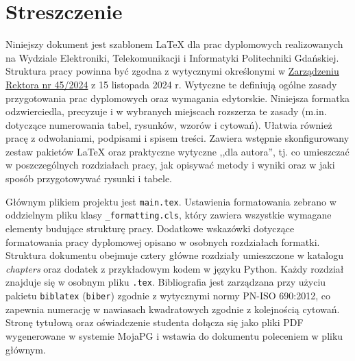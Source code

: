 \chapter*{Streszczenie}

Niniejszy dokument jest szablonem \LaTeX{} dla prac dyplomowych realizowanych na Wydziale Elektroniki, Telekomunikacji i Informatyki Politechniki Gdańskiej. Struktura pracy powinna być zgodna z wytycznymi określonymi w \href{\detokenize{https://cdn.files.pg.edu.pl/eti/Dziekanat/regulaminy/ZR%2045-2024.pdf}}{Zarządzeniu Rektora nr 45/2024} z 15 listopada 2024 r. Wytyczne te definiują ogólne zasady przygotowania prac dyplomowych oraz wymagania edytorskie. Niniejsza formatka odzwierciedla, precyzuje i w wybranych miejscach rozszerza te zasady (m.in. dotyczące numerowania tabel, rysunków, wzorów i cytowań). Ułatwia również pracę z odwołaniami, podpisami i spisem treści. Zawiera wstępnie skonfigurowany zestaw pakietów \LaTeX{} oraz praktyczne wytyczne ,,dla autora'', tj. co umieszczać w poszczególnych rozdziałach pracy, jak opisywać metody i wyniki oraz w jaki sposób przygotowywać rysunki i tabele.

Głównym plikiem projektu jest \texttt{main.tex}. Ustawienia formatowania zebrano w oddzielnym pliku klasy \texttt{\_formatting.cls}, który zawiera wszystkie wymagane elementy budujące strukturę pracy. Dodatkowe wskazówki dotyczące formatowania pracy dyplomowej opisano w osobnych rozdziałach formatki. Struktura dokumentu obejmuje cztery główne rozdziały umieszczone w katalogu \emph{chapters} oraz dodatek z przykładowym kodem w języku Python. Każdy rozdział znajduje się w osobnym pliku \texttt{.tex}. Bibliografia jest zarządzana przy użyciu pakietu \texttt{biblatex} (\texttt{biber}) zgodnie z wytycznymi normy PN-ISO 690:2012, co zapewnia numerację w nawiasach kwadratowych zgodnie z kolejnością cytowań. Stronę tytułową oraz oświadczenie studenta dołącza się jako pliki PDF wygenerowane w systemie MojaPG i wstawia do dokumentu poleceniem \verb|| w pliku głównym.

